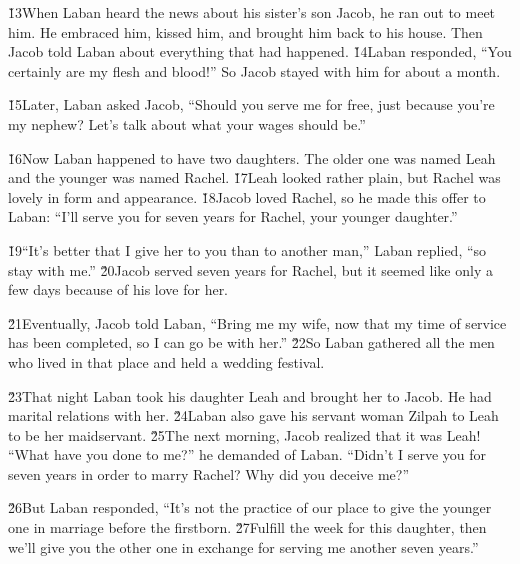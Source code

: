 \v{13}When Laban heard the news about his sister's son Jacob, he ran out to meet him. He embraced him, kissed him, and brought him back to his house. Then Jacob told Laban about everything that had happened. \v{14}Laban responded, ``You certainly are my flesh and blood!'' So Jacob stayed with him for about a month.

\v{15}Later, Laban asked Jacob, ``Should you serve me for free, just because you're my nephew? Let's talk about what your wages should be.''

\v{16}Now Laban happened to have two daughters. The older one was named Leah and the younger was named Rachel. \v{17}Leah looked rather plain, but Rachel was lovely in form and appearance. \v{18}Jacob loved Rachel, so he made this offer to Laban: ``I'll serve you for seven years for Rachel, your younger daughter.''

\v{19}``It's better that I give her to you than to another man,'' Laban replied, ``so stay with me.'' \v{20}Jacob served seven years for Rachel, but it seemed like only a few days because of his love for her.

\v{21}Eventually, Jacob told Laban, ``Bring me my wife, now that my time of service has been completed, so I can go be with her.'' \v{22}So Laban gathered all the men who lived in that place and held a wedding festival.

\v{23}That night Laban took his daughter Leah and brought her to Jacob. He had marital relations with her. \v{24}Laban also gave his servant woman Zilpah to Leah to be her maidservant. \v{25}The next morning, Jacob realized that it was Leah! ``What have you done to me?'' he demanded of Laban. ``Didn't I serve you for seven years in order to marry Rachel? Why did you deceive me?''

\v{26}But Laban responded, ``It's not the practice of our place to give the younger one in marriage before the firstborn. \v{27}Fulfill the week for this daughter, then we'll give you the other one in exchange for serving me another seven years.''

